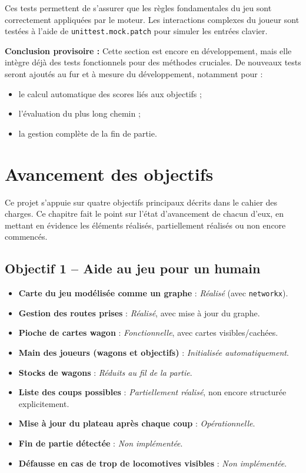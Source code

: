 \documentclass[a4paper,12pt]{report}
\begin{document}
\vspace{0.5em}
Ces tests permettent de s'assurer que les règles fondamentales du jeu sont correctement appliquées par le moteur. Les interactions complexes du joueur sont testées à l’aide de \texttt{unittest.mock.patch} pour simuler les entrées clavier.

\vspace{1em}
\textbf{Conclusion provisoire :}
Cette section est encore en développement, mais elle intègre déjà des tests fonctionnels pour des méthodes cruciales. De nouveaux tests seront ajoutés au fur et à mesure du développement, notamment pour :
\begin{itemize}
    \item le calcul automatique des scores liés aux objectifs ;
    \item l’évaluation du plus long chemin ;
    \item la gestion complète de la fin de partie.
\end{itemize}

\chapter{Avancement des objectifs}

Ce projet s'appuie sur quatre objectifs principaux décrits dans le cahier des charges. Ce chapitre fait le point sur l'état d'avancement de chacun d'eux, en mettant en évidence les éléments réalisés, partiellement réalisés ou non encore commencés.

\section*{Objectif 1 – Aide au jeu pour un humain}

\begin{itemize}
    \item \textbf{Carte du jeu modélisée comme un graphe} : \textit{Réalisé} (avec \texttt{networkx}).
    \item \textbf{Gestion des routes prises} : \textit{Réalisé}, avec mise à jour du graphe.
    \item \textbf{Pioche de cartes wagon} : \textit{Fonctionnelle}, avec cartes visibles/cachées.
    \item \textbf{Main des joueurs (wagons et objectifs)} : \textit{Initialisée automatiquement}.
    \item \textbf{Stocks de wagons} : \textit{Réduits au fil de la partie}.
    \item \textbf{Liste des coups possibles} : \textit{Partiellement réalisé}, non encore structurée explicitement.
    \item \textbf{Mise à jour du plateau après chaque coup} : \textit{Opérationnelle}.
    \item \textbf{Fin de partie détectée} : \textit{Non implémentée}.
    \item \textbf{Défausse en cas de trop de locomotives visibles} : \textit{Non implémentée}.
\end{itemize}
\end{document}
